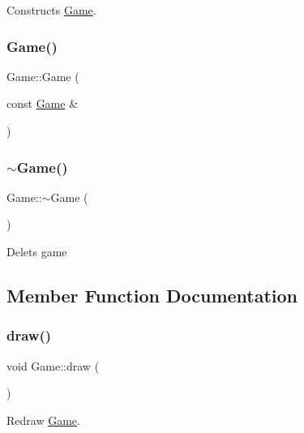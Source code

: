 Constructs \hyperlink{classGame}{Game}. \mbox{\label{classGame_aa79443880de5f26387c2a1c70c8c1aae}} 
\subsubsection{\texorpdfstring{Game()}{Game()}\hspace{0.1cm}{\footnotesize\ttfamily [2/2]}}
{\footnotesize\ttfamily Game\+::\+Game (\begin{DoxyParamCaption}\item[{const \hyperlink{classGame}{Game} \&}]{ }\end{DoxyParamCaption})\hspace{0.3cm}{\ttfamily [private]}}

\mbox{\label{classGame_ae3d112ca6e0e55150d2fdbc704474530}} 
\subsubsection{\texorpdfstring{$\sim$\+Game()}{~Game()}}
{\footnotesize\ttfamily Game\+::$\sim$\+Game (\begin{DoxyParamCaption}{ }\end{DoxyParamCaption})\hspace{0.3cm}{\ttfamily [private]}}

Delets game 

\subsection{Member Function Documentation}
\mbox{\label{classGame_a6d54497ce3a66f6dd45eacfdccc8d0bd}} 
\subsubsection{\texorpdfstring{draw()}{draw()}}
{\footnotesize\ttfamily void Game\+::draw (\begin{DoxyParamCaption}{ }\end{DoxyParamCaption})}

Redraw \hyperlink{classGame}{Game}. \mbox{\label{classGame_a1946c2dd23aadfed4d91944f862294e8}} 

